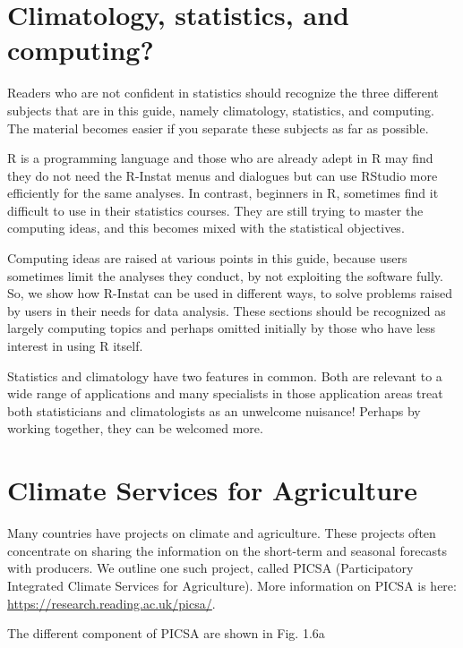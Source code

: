 \documentclass[
  letterpaper,
  DIV=11,
  numbers=noendperiod]{scrreprt}
\begin{document}
\section{Climatology, statistics, and
computing?}\label{climatology-statistics-and-computing}

Readers who are not confident in statistics should recognize the three
different subjects that are in this guide, namely climatology,
statistics, and computing. The material becomes easier if you separate
these subjects as far as possible.

R is a programming language and those who are already adept in R may
find they do not need the R-Instat menus and dialogues but can use
RStudio more efficiently for the same analyses. In contrast, beginners
in R, sometimes find it difficult to use in their statistics courses.
They are still trying to master the computing ideas, and this becomes
mixed with the statistical objectives.

Computing ideas are raised at various points in this guide, because
users sometimes limit the analyses they conduct, by not exploiting the
software fully. So, we show how R-Instat can be used in different ways,
to solve problems raised by users in their needs for data analysis.
These sections should be recognized as largely computing topics and
perhaps omitted initially by those who have less interest in using R
itself.

Statistics and climatology have two features in common. Both are
relevant to a wide range of applications and many specialists in those
application areas treat both statisticians and climatologists as an
unwelcome nuisance! Perhaps by working together, they can be welcomed
more.

\section{Climate Services for
Agriculture}\label{climate-services-for-agriculture}

Many countries have projects on climate and agriculture. These projects
often concentrate on sharing the information on the short-term and
seasonal forecasts with producers. We outline one such project, called
PICSA (Participatory Integrated Climate Services for Agriculture). More
information on PICSA is here:
\href{https://research.reading.ac.uk/picsa/}{\ul{https://research.reading.ac.uk/picsa/}}.

The different component of PICSA are shown in Fig. 1.6a
\end{document}

